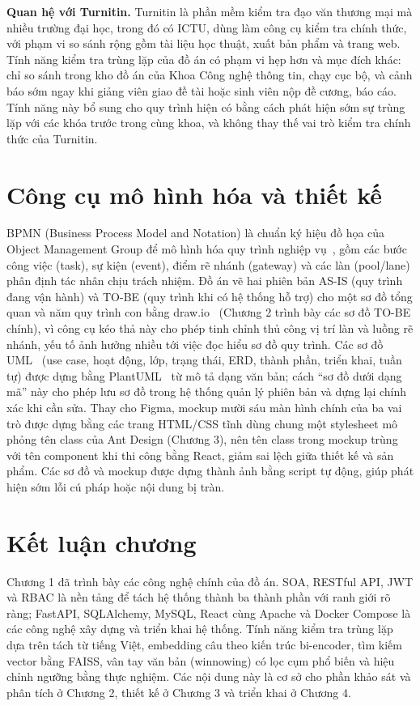 \documentclass[../main.tex]{subfiles}
\begin{document}
\textbf{Quan hệ với Turnitin.} Turnitin là phần mềm kiểm tra đạo văn thương mại mà nhiều trường đại học, trong đó có ICTU, dùng làm công cụ kiểm tra chính thức, với phạm vi so sánh rộng gồm tài liệu học thuật, xuất bản phẩm và trang web. Tính năng kiểm tra trùng lặp của đồ án có phạm vi hẹp hơn và mục đích khác: chỉ so sánh trong kho đồ án của Khoa Công nghệ thông tin, chạy cục bộ, và cảnh báo sớm ngay khi giảng viên giao đề tài hoặc sinh viên nộp đề cương, báo cáo. Tính năng này bổ sung cho quy trình hiện có bằng cách phát hiện sớm sự trùng lặp với các khóa trước trong cùng khoa, và không thay thế vai trò kiểm tra chính thức của Turnitin.

\section{Công cụ mô hình hóa và thiết kế}\label{sec:c1-mo-hinh-hoa}

BPMN (Business Process Model and Notation) là chuẩn ký hiệu đồ họa của Object Management Group để mô hình hóa quy trình nghiệp vụ~\cite{bpmn2}, gồm các bước công việc (task), sự kiện (event), điểm rẽ nhánh (gateway) và các làn (pool/lane) phân định tác nhân chịu trách nhiệm. Đồ án vẽ hai phiên bản AS-IS (quy trình đang vận hành) và TO-BE (quy trình khi có hệ thống hỗ trợ) cho một sơ đồ tổng quan và năm quy trình con bằng draw.io~\cite{drawio} (Chương 2 trình bày các sơ đồ TO-BE chính), vì công cụ kéo thả này cho phép tinh chỉnh thủ công vị trí làn và luồng rẽ nhánh, yếu tố ảnh hưởng nhiều tới việc đọc hiểu sơ đồ quy trình. Các sơ đồ UML~\cite{uml251} (use case, hoạt động, lớp, trạng thái, ERD, thành phần, triển khai, tuần tự) được dựng bằng PlantUML~\cite{plantuml} từ mô tả dạng văn bản; cách ``sơ đồ dưới dạng mã'' này cho phép lưu sơ đồ trong hệ thống quản lý phiên bản và dựng lại chính xác khi cần sửa. Thay cho Figma, mockup mười sáu màn hình chính của ba vai trò được dựng bằng các trang HTML/CSS tĩnh dùng chung một stylesheet mô phỏng tên class của Ant Design (Chương 3), nên tên class trong mockup trùng với tên component khi thi công bằng React, giảm sai lệch giữa thiết kế và sản phẩm. Các sơ đồ và mockup được dựng thành ảnh bằng script tự động, giúp phát hiện sớm lỗi cú pháp hoặc nội dung bị tràn.

\section{Kết luận chương}

Chương 1 đã trình bày các công nghệ chính của đồ án. SOA, RESTful API, JWT và RBAC là nền tảng để tách hệ thống thành ba thành phần với ranh giới rõ ràng; FastAPI, SQLAlchemy, MySQL, React cùng Apache và Docker Compose là các công nghệ xây dựng và triển khai hệ thống. Tính năng kiểm tra trùng lặp dựa trên tách từ tiếng Việt, embedding câu theo kiến trúc bi-encoder, tìm kiếm vector bằng FAISS, vân tay văn bản (winnowing) có lọc cụm phổ biến và hiệu chỉnh ngưỡng bằng thực nghiệm. Các nội dung này là cơ sở cho phần khảo sát và phân tích ở Chương 2, thiết kế ở Chương 3 và triển khai ở Chương 4.
\end{document}
